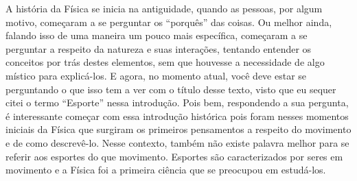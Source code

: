 \begin{multicols}{2}

A história da Física se inicia na antiguidade, quando as pessoas, por algum motivo, começaram a se perguntar os ``porquês'' das coisas. Ou melhor ainda, falando isso de uma maneira um pouco mais específica, começaram a se perguntar a respeito da natureza e suas interações, tentando entender os conceitos por trás destes elementos, sem que houvesse a necessidade de algo místico para explicá-los. E agora, no momento atual, você deve estar se perguntando o que isso tem a ver com o título desse texto, visto que eu sequer citei o termo ``Esporte'' nessa introdução. Pois bem, respondendo a sua pergunta, é interessante começar com essa introdução histórica pois foram nesses momentos iniciais da Física que surgiram os primeiros pensamentos a respeito do movimento e de como descrevê-lo. Nesse contexto, também não existe palavra melhor para se referir aos esportes do que movimento. Esportes são caracterizados por seres em movimento e a Física foi a primeira ciência que se preocupou em estudá-los.
 

\end{multicols}
